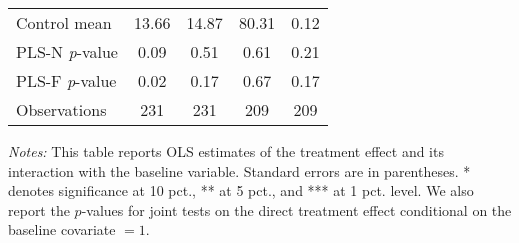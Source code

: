 \begin{table}[ht]
{\begin{threeparttable}
\begin{tabular}{l*{4}{c}}
Control mean    &    13.66         &    14.87         &    80.31         &     0.12         \\
PLS-N \emph{p}-value&     0.09         &     0.51         &     0.61         &     0.21         \\
PLS-F \emph{p}-value&     0.02         &     0.17         &     0.67         &     0.17         \\
Observations    &      231         &      231         &      209         &      209         \\
\bottomrule \end{tabular} \begin{tablenotes}[flushleft] \footnotesize \item \emph{Notes:} This table reports OLS estimates of the treatment effect and its interaction with the baseline variable. Standard errors are in parentheses. * denotes significance at 10 pct., ** at 5 pct., and *** at 1 pct. level. We also report the \(p\)-values for joint tests on the direct treatment effect conditional on the baseline covariate $= 1$. \end{tablenotes} \end{threeparttable} } \end{table}

